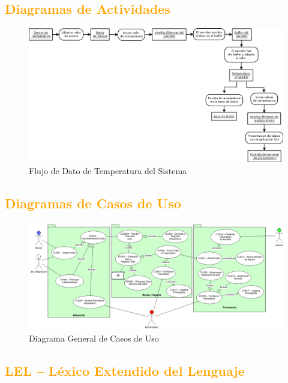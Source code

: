 \subsection{\textcolor{orange}{Diagramas de Actividades}}
\begin{figure}[h!]
 \begin{center}
  \includegraphics[width=1\textwidth,keepaspectratio=true]{img/diagactiv.png}
 \caption{Flujo de Dato de Temperatura del Sistema}
  \label{fig:esquema}
 \end{center}
\end{figure}
\newpage
\subsection{\textcolor{orange}{Diagramas de Casos de Uso}}
\begin{figure}[h!]
 \begin{center}
  \includegraphics[width=1\textwidth,keepaspectratio=true]{img/usecases.png}
  \caption{Diagrama General de Casos de Uso}
  \label{fig:esquema}
 \end{center}
\end{figure}

\subsection{\textcolor{orange}{LEL – Léxico Extendido del Lenguaje}}

